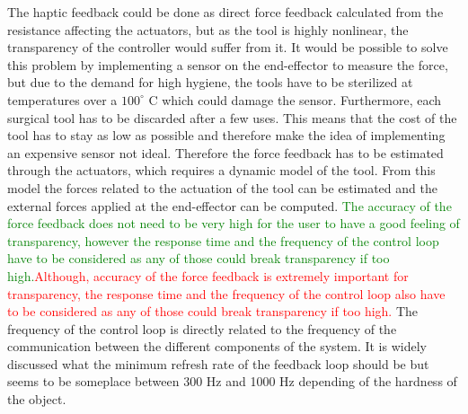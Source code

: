 The haptic feedback could be done as direct force feedback calculated from the resistance affecting the actuators, but as the tool is highly nonlinear, the transparency of the controller would suffer from it. It would be possible to solve this problem by implementing a sensor on the end-effector to measure the force, but due to the demand for high hygiene, the tools have to be sterilized at temperatures over a $100^\circ$ C which could damage the sensor. Furthermore, each surgical tool has to be discarded after a few uses\cite{catalog_davinci}. This means that the cost of the tool has to stay as low as possible and therefore make the idea of implementing an expensive sensor not ideal. Therefore the force feedback has to be estimated through the actuators, which requires a dynamic model of the tool. From this model the forces related to the actuation of the tool can be estimated and the external forces applied at the end-effector can be computed. \textcolor{green}{The accuracy of the force feedback does not need to be very high for the user to have a good feeling of transparency, however the response time and the frequency of the control loop have to be considered as any of those could break transparency if too high.}\textcolor{red}{Although, accuracy of the force feedback is extremely important for transparency, the response time and the frequency of the control loop also have to be considered as any of those could break transparency if too high.} The frequency of the control loop is directly related to the frequency of the communication between the different components of the system. It is widely discussed what the minimum refresh rate of the feedback loop should be but seems to be someplace between 300 Hz and 1000 Hz depending of the hardness of the object\cite{coles2011role}.%


